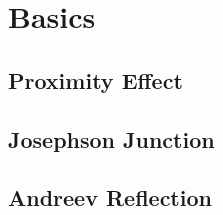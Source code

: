 \documentclass[a4paper]{article}
\begin{document}
	\section{Basics}
	\subsection{Proximity Effect}
	\subsection{Josephson Junction}
	\subsection{Andreev Reflection}
	
	
\end{document}
